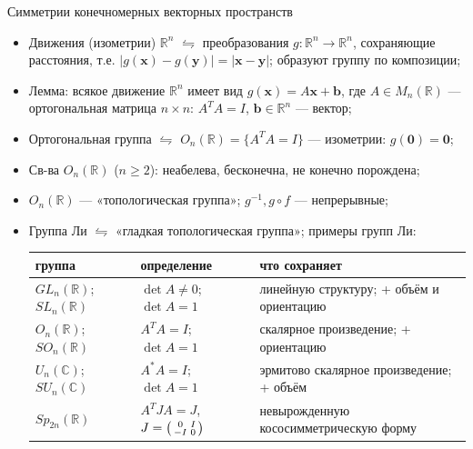 \documentclass[serif, aspectratio=169]{beamer}
\begin{document}
\begin{frame}{Симметрии конечномерных векторных пространств}
    \begin{itemize}
        \item Движения (изометрии) $\mathbb{R}^n$ $\leftrightharpoons$ преобразования $g:\mathbb{R}^n\rightarrow \mathbb{R}^n$, сохраняющие расстояния, т.е. $|g(\mathbf{x})-g(\mathbf{y})|=|\mathbf{x}-\mathbf{y}|$; образуют группу по композиции;
        \item Лемма: всякое движение $\mathbb{R}^n$ имеет вид $g(\mathbf{x})=A\mathbf{x}+\mathbf{b}$, где $A\in M_n(\mathbb{R})$ --- ортогональная матрица $n\times n$: $A^TA=I$, $\mathbf{b}\in\mathbb{R}^n$ --- вектор;
        \item Ортогональная группа $\leftrightharpoons$ $O_n(\mathbb{R})=\{A^TA=I\}$ --- изометрии: $g(\mathbf{0})=\mathbf{0}$;
        \item Св-ва $O_n(\mathbb{R})$ ($n\geqslant 2$): неабелева, бесконечна, не конечно порождена;
        \item $O_n(\mathbb{R})$ --- «топологическая группа»; $g^{-1}, g\circ f$ --- непрерывные;
        \item Группа Ли $\leftrightharpoons$ «гладкая топологическая группа»; примеры групп Ли:
        \begin{center}
            \footnotesize
            \begin{tabular}{lll}
                \toprule
                группа & определение & что сохраняет \\
                \midrule
                $GL_n(\mathbb{R})$; $SL_n(\mathbb{R})$ & $\det A\neq0$;\ $\det A=1$ & линейную структуру; + объём и ориентацию \\
                $O_n(\mathbb{R})$; $SO_n(\mathbb{R})$ & $A^TA=I$;\ $\det A=1$ & скалярное произведение; + ориентацию \\
                $U_n(\mathbb{C})$; $SU_n(\mathbb{C})$ & $A^*A=I$;\ $\det A=1$ & эрмитово скалярное произведение; + объём \\
                $Sp_{2n}(\mathbb{R})$ & $A^TJA=J$, $J=\begin{psmallmatrix}0&I\\-I&0\end{psmallmatrix}$ & невырожденную кососимметрическую форму \\
                \bottomrule
            \end{tabular}
        \end{center}        
    \end{itemize}

\end{frame}
\end{document}
